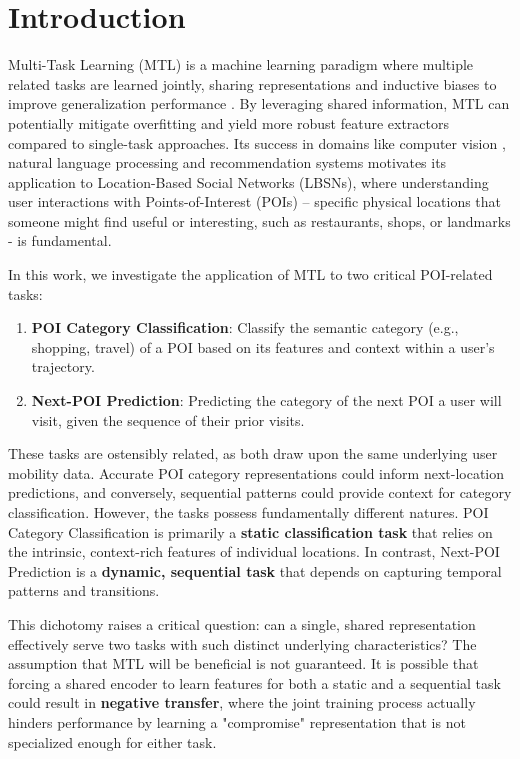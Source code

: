 \section{Introduction}

Multi-Task Learning (MTL) is a machine learning paradigm where multiple related tasks are learned jointly, sharing representations and inductive biases to improve generalization performance \cite{caruana1997multitask}. By leveraging shared information, MTL can potentially mitigate overfitting and yield more robust feature extractors compared to single-task approaches. Its success in domains like computer vision \cite{kokkinos2016ubernet}, natural language processing \cite{wei2022finetuned} and recommendation systems \cite{zhang2020interactive} motivates its application to Location-Based Social Networks (LBSNs), where understanding user interactions with Points-of-Interest (POIs)  – specific physical locations that someone might find useful or interesting, such as restaurants, shops, or landmarks - is fundamental.

In this work, we investigate the application of MTL to two critical POI-related tasks:
\begin{enumerate}
    \item \textbf{POI Category Classification}: Classify the semantic category (e.g., shopping, travel) of a POI based on its features and context within a user's trajectory.
    \item \textbf{Next-POI Prediction}: Predicting the category of the next POI a user will visit, given the sequence of their prior visits.
\end{enumerate}

These tasks are ostensibly related, as both draw upon the same underlying user mobility data. Accurate POI category representations could inform next-location predictions, and conversely, sequential patterns could provide context for category classification. However, the tasks possess fundamentally different natures. POI Category Classification is primarily a \textbf{static classification task} that relies on the intrinsic, context-rich features of individual locations. In contrast, Next-POI Prediction is a \textbf{dynamic, sequential task} that depends on capturing temporal patterns and transitions.

This dichotomy raises a critical question: can a single, shared representation effectively serve two tasks with such distinct underlying characteristics? The assumption that MTL will be beneficial is not guaranteed. It is possible that forcing a shared encoder to learn features for both a static and a sequential task could result in \textbf{negative transfer}, where the joint training process actually hinders performance by learning a "compromise" representation that is not specialized enough for either task.

